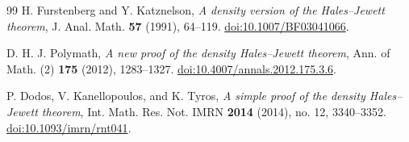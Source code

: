 \documentclass[11pt]{amsart}
\theoremstyle{definition}
\theoremstyle{remark}
\numberwithin{equation}{section}
\begin{document}
\begin{thebibliography}{99}
H. Furstenberg and Y. Katznelson,
\emph{A density version of the Hales--Jewett theorem},
J. Anal. Math. \textbf{57} (1991), 64--119.
\href{https://doi.org/10.1007/BF03041066}{doi:10.1007/BF03041066}.

D. H. J. Polymath,
\emph{A new proof of the density Hales--Jewett theorem},
Ann. of Math. (2) \textbf{175} (2012), 1283--1327.
\href{https://doi.org/10.4007/annals.2012.175.3.6}{doi:10.4007/annals.2012.175.3.6}.

P. Dodos, V. Kanellopoulos, and K. Tyros,
\emph{A simple proof of the density Hales--Jewett theorem},
Int. Math. Res. Not. IMRN \textbf{2014} (2014), no. 12, 3340--3352.
\href{https://doi.org/10.1093/imrn/rnt041}{doi:10.1093/imrn/rnt041}.
\end{thebibliography}
\end{document}
